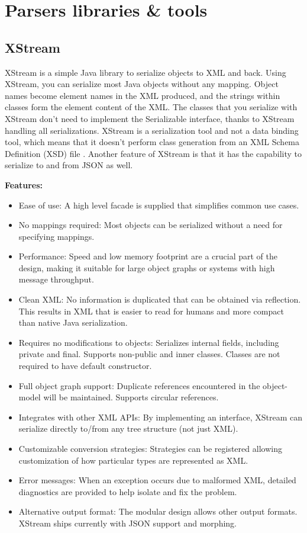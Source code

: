 \section{Parsers libraries \& tools}

\subsection{XStream}
XStream is a simple Java library to serialize objects to XML and back. Using XStream, you can serialize most Java objects without any mapping. Object names become element names in the XML produced, and the strings within classes form the element content of the XML.
\newline
\newline
The classes that you serialize with XStream don't need to implement the Serializable interface, thanks to XStream handling all serializations. XStream is a serialization tool and not a data binding tool, which means that it doesn't perform class generation from an XML Schema Definition (XSD) file \cite{bib:xstream} \cite{bib:ibm}.
\newline
\newline
Another feature of XStream is that it has the capability to serialize to and from JSON as well.

\textbf{Features:}
\begin{itemize}
\item{}Ease of use: A high level facade is supplied that simplifies common use cases.
\item{}No mappings required: Most objects can be serialized without a need for specifying mappings.
\item{}Performance: Speed and low memory footprint are a crucial part of the design, making it suitable for large object graphs or systems with high message throughput.
\item{}Clean XML: No information is duplicated that can be obtained via reflection. This results in XML that is easier to read for humans and more compact than native Java serialization.
\item{}Requires no modifications to objects: Serializes internal fields, including private and final. Supports non-public and inner classes. Classes are not required to have default constructor.
\item{}Full object graph support: Duplicate references encountered in the object-model will be maintained. Supports circular references.
\item{}Integrates with other XML APIs: By implementing an interface, XStream can serialize directly to/from any tree structure (not just XML).
\item{}Customizable conversion strategies: Strategies can be registered allowing customization of how particular types are represented as XML.
\item{}Error messages: When an exception occurs due to malformed XML, detailed diagnostics are provided to help isolate and fix the problem.
\item{}Alternative output format: The modular design allows other output formats. XStream ships currently with JSON support and morphing.
\end{itemize}

